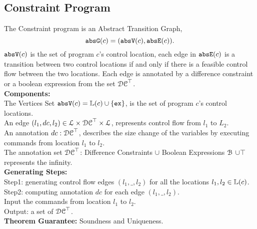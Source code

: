 \subsection{Constraint Program}
\label{sec:abs_prog}
The Constraint program is an Abstract Transition Graph,
\[{\mathtt{abs}}{{\mathtt{G}}}(c) =({\mathtt{abs}}{{\mathtt{V}}}(c), {\mathtt{abs}}{{\mathtt{E}}}(c)).\]
%
${\mathtt{abs}}{{\mathtt{V}}}(c)$ is the set of program $c$'s control location, each edge in ${\mathtt{abs}}{{\mathtt{E}}}(c)$ is a transition
between two control locations if and only if there is a feasible control flow between the two locations.
Each edge is annotated by a difference constraint \cite{sinn2017complexity} or a boolean expression
from the set $\mathcal{DC}^{\top}$.
\\
\textbf{Components:} 
\\
The Vertices Set ${\mathtt{abs}}{{\mathtt{V}}}(c) = \mathbb{L}(c)\cup\{{{\mathtt{ex}}}\}$, is the set of program $c$'s control locations.
\\
An edge $(l_1, dc, l_2) \in \mathcal{L} \times \mathcal{DC}^{\top} \times \mathcal{L}$, represents control flow from $l_1$ to $L_2$.
\\
An annotation $ dc: \mathcal{DC}^{\top}$,
describes the size change of the variables by executing commands from location $l_1$ to $l_2$.
\\
The annotation set $\mathcal{DC}^{\top}$: Difference Constraints $\cup$ Boolean Expressions $\mathcal{B}$ $\cup \top$ represents the infinity.
\\
\textbf{Generating Steps:} 
\\
Step1: generating control flow edges $(l_1, \_, l_2)$ for all the locations $l_1, l_2 \in \mathbb{L}(c)$.
\\
Step2: computing annotation $dc$ for each edge $(l_1, \_, l_2)$.
\\
Input the commands from location $l_1$ to $l_2$.
\\
Output: a set of $\mathcal{DC}^{\top}$.
\\
\textbf{Theorem Guarantee:}
Soundness and Uniqueness.
